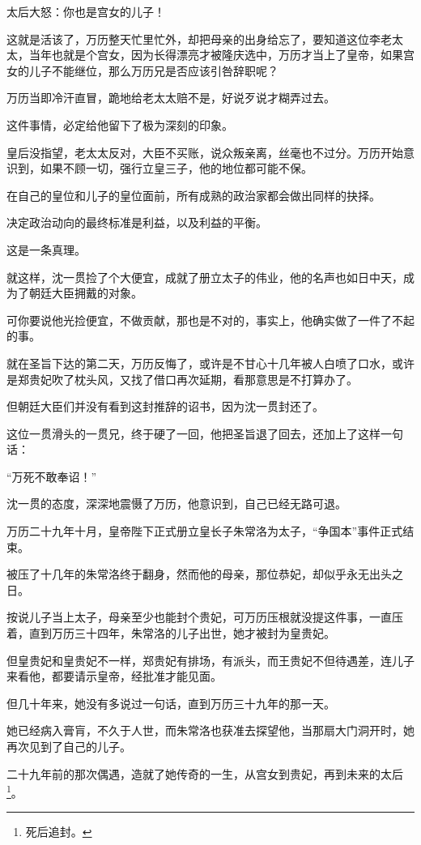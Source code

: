 \begin{multicols}{\theparacolNo}
		太后大怒：你也是宫女的儿子！

		这就是活该了，万历整天忙里忙外，却把母亲的出身给忘了，要知道这位李老太太，当年也就是个宫女，因为长得漂亮才被隆庆选中，万历才当上了皇帝，如果宫女的儿子不能继位，那么万历兄是否应该引咎辞职呢？

		万历当即冷汗直冒，跪地给老太太赔不是，好说歹说才糊弄过去。

		这件事情，必定给他留下了极为深刻的印象。

		皇后没指望，老太太反对，大臣不买账，说众叛亲离，丝毫也不过分。万历开始意识到，如果不顾一切，强行立皇三子，他的地位都可能不保。

		在自己的皇位和儿子的皇位面前，所有成熟的政治家都会做出同样的抉择。

		决定政治动向的最终标准是利益，以及利益的平衡。

		这是一条真理。

		就这样，沈一贯捡了个大便宜，成就了册立太子的伟业，他的名声也如日中天，成为了朝廷大臣拥戴的对象。

		可你要说他光捡便宜，不做贡献，那也是不对的，事实上，他确实做了一件了不起的事。

		就在圣旨下达的第二天，万历反悔了，或许是不甘心十几年被人白喷了口水，或许是郑贵妃吹了枕头风，又找了借口再次延期，看那意思是不打算办了。

		但朝廷大臣们并没有看到这封推辞的诏书，因为沈一贯封还了。

		这位一贯滑头的一贯兄，终于硬了一回，他把圣旨退了回去，还加上了这样一句话：

		“万死不敢奉诏！”

		沈一贯的态度，深深地震慑了万历，他意识到，自己已经无路可退。

		万历二十九年十月，皇帝陛下正式册立皇长子朱常洛为太子，“争国本”事件正式结束。

		被压了十几年的朱常洛终于翻身，然而他的母亲，那位恭妃，却似乎永无出头之日。

		按说儿子当上太子，母亲至少也能封个贵妃，可万历压根就没提这件事，一直压着，直到万历三十四年，朱常洛的儿子出世，她才被封为皇贵妃。

		但皇贵妃和皇贵妃不一样，郑贵妃有排场，有派头，而王贵妃不但待遇差，连儿子来看他，都要请示皇帝，经批准才能见面。

		但几十年来，她没有多说过一句话，直到万历三十九年的那一天。

		她已经病入膏肓，不久于人世，而朱常洛也获准去探望他，当那扇大门洞开时，她再次见到了自己的儿子。

		二十九年前的那次偶遇，造就了她传奇的一生，从宫女到贵妃，再到未来的太后\footnote{死后追封。}。


\end{multicols}
